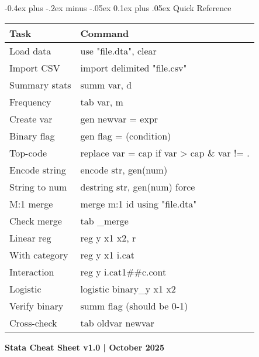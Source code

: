 \documentclass[8pt,letterpaper]{article}
\makeatletter
\renewcommand{\subsection}{\@startsection{subsection}{2}{0mm}%
                                {-0.4ex plus -.2ex minus -.05ex}%
                                {0.1ex plus .05ex}%
                                {\normalfont\fontsize{7.5pt}{7.5pt}\selectfont\bfseries\color{myblue}}}
\makeatother
\begin{document}
\begin{multicols}{2}
\subsection{Quick Reference}

\fontsize{6pt}{6.5pt}\selectfont
\noindent
\begin{tabular*}{\linewidth}{@{\extracolsep{\fill}}ll@{}}
\hline\textbf{Task} & \textbf{Command} \\
\hline
Load data & use "file.dta", clear \\
Import CSV & import delimited "file.csv" \\
Summary stats & summ var, d \\
Frequency & tab var, m \\
Create var & gen newvar = expr \\
Binary flag & gen flag = (condition) \\
Top-code & replace var = cap if var > cap \& var != . \\
Encode string & encode str, gen(num) \\
String to num & destring str, gen(num) force \\
M:1 merge & merge m:1 id using "file.dta" \\
Check merge & tab \_merge \\
Linear reg & reg y x1 x2, r \\
With category & reg y x1 i.cat \\
Interaction & reg y i.cat1\#\#c.cont \\
Logistic & logistic binary\_y x1 x2 \\
Verify binary & summ flag (should be 0-1) \\
Cross-check & tab oldvar newvar \\
\hline
\end{tabular*}
\normalsize

\vspace{0.1cm}
{\fontsize{5pt}{6pt}\selectfont \textbf{Stata Cheat Sheet v1.0 | October 2025}}

\end{multicols}
\end{document}
